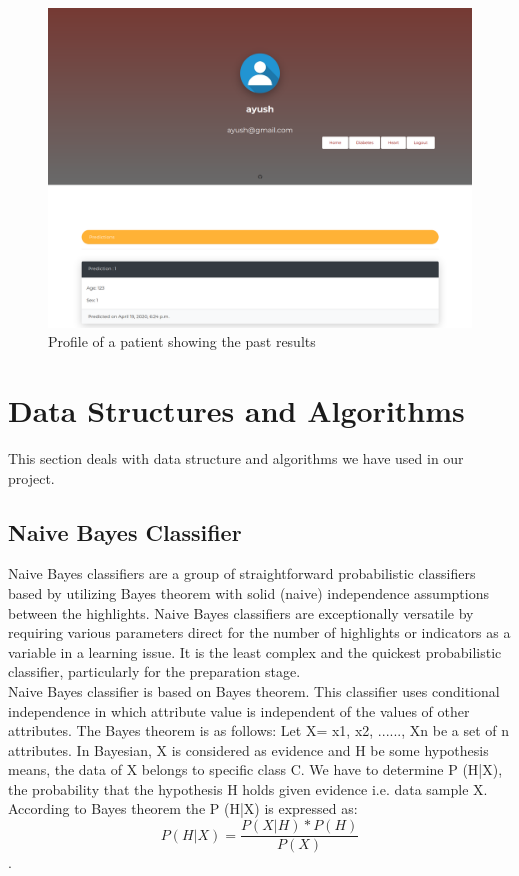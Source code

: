 \documentclass[oneside,12pt]{Classes/VTU}
\begin{document}
    			\begin{figure}
    				\begin{center}
    				\includegraphics[width=17cm]{Screenshots/profile.PNG}
    				\caption{Profile of a patient showing the past results}
    				\end{center}
    			\end{figure}
    
    \pagebreak
    \section{Data Structures and Algorithms}
    	This section deals with data structure and algorithms we have used in our project.
    	
    \subsection{Naive Bayes Classifier}
    	Naive Bayes classifiers are a group of straightforward probabilistic classifiers based by utilizing Bayes theorem with solid (naive) independence assumptions between the highlights. Naive Bayes classifiers are exceptionally versatile by requiring various parameters direct for the number of highlights or indicators as a variable in a learning issue. It is the least complex and the quickest probabilistic classifier, particularly for the preparation stage.\\
    	Naive Bayes classifier is based on Bayes theorem. This classifier uses conditional independence in which attribute value is independent of the values of other attributes. The Bayes theorem is as follows:
    	Let X= {x1, x2, ......, Xn} be a set of n attributes. In Bayesian, X is considered as evidence and H be some hypothesis means, the data of X belongs to specific class C. We have to determine P (H|X), the probability that the hypothesis H holds given evidence i.e. data sample X. According to Bayes theorem the P (H|X) is expressed as: \\
    	\[P(H|X) = \frac{P(X|H) * P(H)}{P(X)}\].
    	
\end{document}
